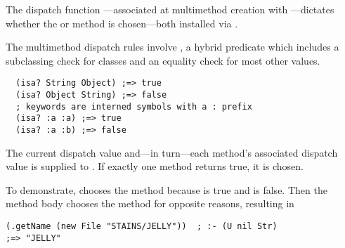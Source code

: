 
The dispatch function ---associated at multimethod creation with ---dictates 
whether the  or  method is chosen---both installed via .

The multimethod dispatch rules involve
, a hybrid predicate which includes a subclassing check for classes and
an equality check for most other values.

\begin{verbatim}
  (isa? String Object) ;=> true
  (isa? Object String) ;=> false
  ; keywords are interned symbols with a : prefix
  (isa? :a :a) ;=> true
  (isa? :a :b) ;=> false
\end{verbatim}

The current dispatch value and---in turn---each method's associated dispatch value
is supplied to . If exactly one method returns true, it is chosen.

To demonstrate,
chooses the  method because
is true and
is false. Then the  method body
chooses the  method for opposite reasons,
resulting in 
\begin{verbatim}
(.getName (new File "STAINS/JELLY"))  ; :- (U nil Str)
;=> "JELLY"
\end{verbatim}

%
%
%

